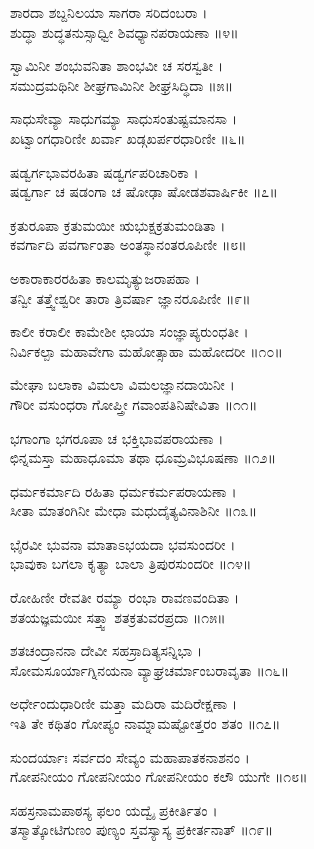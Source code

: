 ಶಾರದಾ ಶಬ್ದನಿಲಯಾ ಸಾಗರಾ ಸರಿದಂಬರಾ ।\\
ಶುದ್ಧಾ ಶುದ್ಧತನುಸ್ಸಾಧ್ವೀ ಶಿವಧ್ಯಾನಪರಾಯಣಾ ॥೪॥

ಸ್ವಾಮಿನೀ ಶಂಭುವನಿತಾ ಶಾಂಭವೀ ಚ ಸರಸ್ವತೀ ।\\
ಸಮುದ್ರಮಥಿನೀ ಶೀಘ್ರಗಾಮಿನೀ ಶೀಘ್ರಸಿದ್ಧಿದಾ ॥೫॥

ಸಾಧುಸೇವ್ಯಾ ಸಾಧುಗಮ್ಯಾ ಸಾಧುಸಂತುಷ್ಟಮಾನಸಾ ।\\
ಖಟ್ವಾಂಗಧಾರಿಣೀ ಖರ್ವಾ ಖಡ್ಗಖರ್ಪರಧಾರಿಣೀ ॥೬॥

ಷಡ್ವರ್ಗಭಾವರಹಿತಾ ಷಡ್ವರ್ಗಪರಿಚಾರಿಕಾ ।\\
ಷಡ್ವರ್ಗಾ ಚ ಷಡಂಗಾ ಚ ಷೋಢಾ ಷೋಡಶವಾರ್ಷಿಕೀ ॥೭॥

ಕ್ರತುರೂಪಾ ಕ್ರತುಮಯೀ ಋಭುಕ್ಷಕ್ರತುಮಂಡಿತಾ ।\\
ಕವರ್ಗಾದಿ ಪವರ್ಗಾಂತಾ ಅಂತಸ್ಥಾನಂತರೂಪಿಣೀ ॥೮॥

ಅಕಾರಾಕಾರರಹಿತಾ ಕಾಲಮೃತ್ಯುಜರಾಪಹಾ ।\\
ತನ್ವೀ ತತ್ತ್ವೇಶ್ವರೀ ತಾರಾ ತ್ರಿವರ್ಷಾ ಜ್ಞಾನರೂಪಿಣೀ ॥೯॥

ಕಾಲೀ ಕರಾಲೀ ಕಾಮೇಶೀ ಛಾಯಾ ಸಂಜ್ಞಾಪ್ಯರುಂಧತೀ ।\\
ನಿರ್ವಿಕಲ್ಪಾ ಮಹಾವೇಗಾ ಮಹೋತ್ಸಾಹಾ ಮಹೋದರೀ ॥೧೦॥

ಮೇಘಾ ಬಲಾಕಾ ವಿಮಲಾ ವಿಮಲಜ್ಞಾನದಾಯಿನೀ ।\\
ಗೌರೀ ವಸುಂಧರಾ ಗೋಪ್ತ್ರೀ ಗವಾಂಪತಿನಿಷೇವಿತಾ ॥೧೧॥

ಭಗಾಂಗಾ ಭಗರೂಪಾ ಚ ಭಕ್ತಿಭಾವಪರಾಯಣಾ ।\\
ಛಿನ್ನಮಸ್ತಾ ಮಹಾಧೂಮಾ ತಥಾ ಧೂಮ್ರವಿಭೂಷಣಾ ॥೧೨॥

ಧರ್ಮಕರ್ಮಾದಿ ರಹಿತಾ ಧರ್ಮಕರ್ಮಪರಾಯಣಾ ।\\
ಸೀತಾ ಮಾತಂಗಿನೀ ಮೇಧಾ ಮಧುದೈತ್ಯವಿನಾಶಿನೀ ॥೧೩॥

ಭೈರವೀ ಭುವನಾ ಮಾತಾಽಭಯದಾ ಭವಸುಂದರೀ ।\\
ಭಾವುಕಾ ಬಗಲಾ ಕೃತ್ಯಾ ಬಾಲಾ ತ್ರಿಪುರಸುಂದರೀ ॥೧೪॥

ರೋಹಿಣೀ ರೇವತೀ ರಮ್ಯಾ ರಂಭಾ ರಾವಣವಂದಿತಾ ।\\
ಶತಯಜ್ಞಮಯೀ ಸತ್ತ್ವಾ ಶತಕ್ರತುವರಪ್ರದಾ ॥೧೫॥

ಶತಚಂದ್ರಾನನಾ ದೇವೀ ಸಹಸ್ರಾದಿತ್ಯಸನ್ನಿಭಾ ।\\
ಸೋಮಸೂರ್ಯಾಗ್ನಿನಯನಾ ವ್ಯಾಘ್ರಚರ್ಮಾಂಬರಾವೃತಾ ॥೧೬॥

ಅರ್ಧೇಂದುಧಾರಿಣೀ ಮತ್ತಾ ಮದಿರಾ ಮದಿರೇಕ್ಷಣಾ ।\\
ಇತಿ ತೇ ಕಥಿತಂ ಗೋಪ್ಯಂ ನಾಮ್ನಾಮಷ್ಟೋತ್ತರಂ ಶತಂ ॥೧೭॥

ಸುಂದರ್ಯಾಃ ಸರ್ವದಂ ಸೇವ್ಯಂ ಮಹಾಪಾತಕನಾಶನಂ ।\\
ಗೋಪನೀಯಂ ಗೋಪನೀಯಂ ಗೋಪನೀಯಂ ಕಲೌ ಯುಗೇ ॥೧೮॥

ಸಹಸ್ರನಾಮಪಾಠಸ್ಯ ಫಲಂ ಯದ್ವೈ ಪ್ರಕೀರ್ತಿತಂ ।\\
ತಸ್ಮಾತ್ಕೋಟಿಗುಣಂ ಪುಣ್ಯಂ ಸ್ತವಸ್ಯಾಸ್ಯ ಪ್ರಕೀರ್ತನಾತ್ ॥೧೯॥

